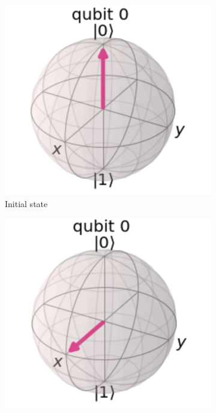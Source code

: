 \begin{figure}[h]
    \centering
    \begin{subfigure}[h]{0.24\textwidth}
        \centering
        \includegraphics[width=\textwidth]{lab2/images/hzhGate1.png}
        \caption{Initial state}
        \label{fig:hzhGate1}
    \end{subfigure}
    \hfill
    \begin{subfigure}[h]{0.24\textwidth}
        \centering
        \includegraphics[width=\textwidth]{lab2/images/hzhGate2.png}

\end{subfigure}
\end{figure}
